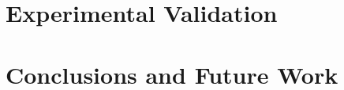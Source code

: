 \section{Experimental Validation}
\label{sec:Experimental}


\section{Conclusions and Future Work}
\label{sec:Conclusion}


%
%


